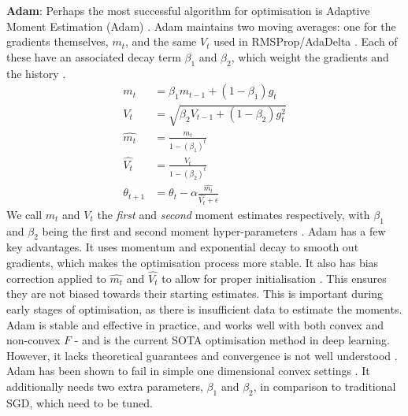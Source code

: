 \textbf{Adam}: Perhaps the most successful algorithm for optimisation is Adaptive Moment Estimation (Adam) \citep{kingma2014adam}. Adam maintains two moving averages: one for the gradients themselves, $m_t$, and the same $V_t$ used in RMSProp/AdaDelta \citep{kingma2014adam}. Each of these have an associated decay term $\beta_1$ and $\beta_2$, which weight the gradients and the history \citep{kingma2014adam}.
\begin{align}
m_t &= \beta_1 m_{t-1} + (1 - \beta_1) g_t \label{eq:m_t} \\
V_t &= \sqrt{\beta_2 V_{t-1} + (1 - \beta_2) g_t^2} \\
\hat{m_t} &= \frac{m_t}{1 - (\beta_1)^t} \\
\hat{V_t} &= \frac{V_t}{1 - (\beta_2)^t} \\
\theta_{t+1} &= \theta_t - \alpha \frac{\hat{m_t}}{{\hat{V_t}} + \epsilon} \label{eq:adam_update}
\end{align}
We call $m_t$ and $V_t$ the \textit{first} and \textit{second} moment estimates respectively, with $\beta_1$ and $\beta_2$ being the first and second moment hyper-parameters \citep{kingma2014adam}. Adam has a few key advantages. It uses momentum and exponential decay to smooth out gradients, which makes the optimisation process more stable. It also has bias correction applied to $\hat{m_t}$ and $\hat{V_t}$ to allow for proper initialisation \citep{kingma2014adam}. This ensures they are not biased towards their starting estimates. This is important during early stages of optimisation, as there is insufficient data to estimate the moments. Adam is stable and effective in practice, and works well with both convex and non-convex $F$ - and is the current SOTA optimisation method in deep learning. However, it lacks theoretical guarantees and convergence is not well understood \citep{reddi2019convergence}. Adam has been shown to fail in simple one dimensional convex settings \citep{reddi2019convergence}. It additionally needs two extra parameters, $\beta_1$ and $\beta_2$, in comparison to traditional SGD, which need to be tuned.

